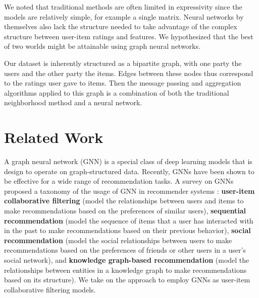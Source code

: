 \documentclass{article}
\begin{document}
We noted that traditional methods are often limited in expressivity since the models are relatively simple, for example a single matrix. Neural networks by themselves also lack the structure needed to take advantage of the complex structure between user-item ratings and features. We hypothesized that the best of two worlds might be attainable using graph neural networks.

Our dataset is inherently structured as a bipartite graph, with one party the users and the other party the items. Edges between these nodes thus correspond to the ratings user gave to items. Then the message passing and aggregation algorithms applied to this graph is a combination of both the traditional neighborhood method and a neural network. 


\section{Related Work} 


A graph neural network (GNN) is a special class of deep learning models that is design to operate on graph-structured data. Recently, GNNs have been shown to be effective for a wide range of recommendation tasks. A survey on GNNs proposed a taxonomy of the usage of GNN in recommender systems \cite{survey}: \textbf{user-item collaborative filtering} (model the relationships between users and items to make recommendations based on the preferences of similar users), \textbf{sequential recommendation} (model the sequence of items that a user has interacted with in the past to make recommendations based on their previous behavior), \textbf{social recommendation} (model the social relationships between users to make recommendations based on the preferences of friends or other users in a user's social network), and \textbf{knowledge graph-based recommendation} (model the relationships between entities in a knowledge graph to make recommendations based on its structure). We take on the approach to employ GNNs as user-item collaborative filtering models. 

\end{document}
